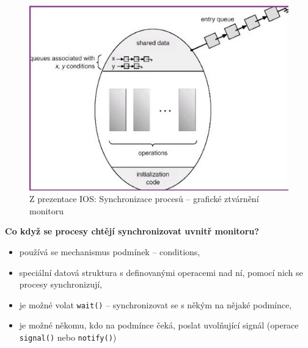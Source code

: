 \documentclass[a4paper, 11pt]{article}
\newcommand{\tcmd}[1]{\texttt{#1}}
\begin{document}
\begin{figure} [h]
    \centering
    \includegraphics[scale=2]{11.1_2.jpg}
    \caption{Z prezentace IOS: Synchronizace procesů -- grafické ztvárnění monitoru}
\end{figure}

\textbf{Co když se procesy chtějí synchronizovat uvnitř monitoru?}
\begin{itemize}
    \item používá se mechanismus podmínek -- conditions,
    \item speciální datová struktura s definovanými operacemi nad ní, pomocí nich se procesy synchronizují,
    \item je možné volat \tcmd{wait()} -- synchronizovat se s někým na nějaké podmínce,
    \item je možné někomu, kdo na podmínce čeká, poslat uvolňující signál (operace \tcmd{signal()} nebo \tcmd{notify()})
\end{itemize}
 
\end{document}
